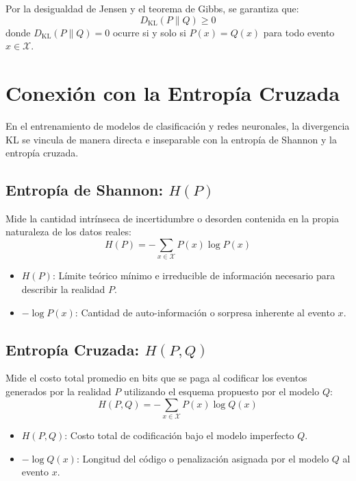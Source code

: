 \documentclass[conference]{IEEEtran}
\begin{document}
	Por la desigualdad de Jensen y el teorema de Gibbs, se garantiza que:
	\begin{equation}
		D_{\text{KL}}(P \parallel Q) \ge 0
	\end{equation}
	donde $D_{\text{KL}}(P \parallel Q) = 0$ ocurre si y solo si $P(x) = Q(x)$ para todo evento $x \in \mathcal{X}$.
	
	\section{Conexión con la Entropía Cruzada}
	En el entrenamiento de modelos de clasificación y redes neuronales, la divergencia KL se vincula de manera directa e inseparable con la entropía de Shannon y la entropía cruzada.
	
	\subsection{Entropía de Shannon: $H(P)$}
	Mide la cantidad intrínseca de incertidumbre o desorden contenida en la propia naturaleza de los datos reales:
	\begin{equation}
		H(P) = -\sum_{x \in \mathcal{X}} P(x) \log P(x)
		\label{eq:shannon_entropy}
	\end{equation}
	\begin{itemize}
		\item $H(P)$: Límite teórico mínimo e irreducible de información necesario para describir la realidad $P$.
		\item $-\log P(x)$: Cantidad de auto-información o sorpresa inherente al evento $x$.
	\end{itemize}
	
	\subsection{Entropía Cruzada: $H(P, Q)$}
	Mide el costo total promedio en bits que se paga al codificar los eventos generados por la realidad $P$ utilizando el esquema propuesto por el modelo $Q$:
	\begin{equation}
		H(P, Q) = -\sum_{x \in \mathcal{X}} P(x) \log Q(x)
		\label{eq:cross_entropy}
	\end{equation}
	\begin{itemize}
		\item $H(P, Q)$: Costo total de codificación bajo el modelo imperfecto $Q$.
		\item $-\log Q(x)$: Longitud del código o penalización asignada por el modelo $Q$ al evento $x$.
	\end{itemize}
	
\end{document}
